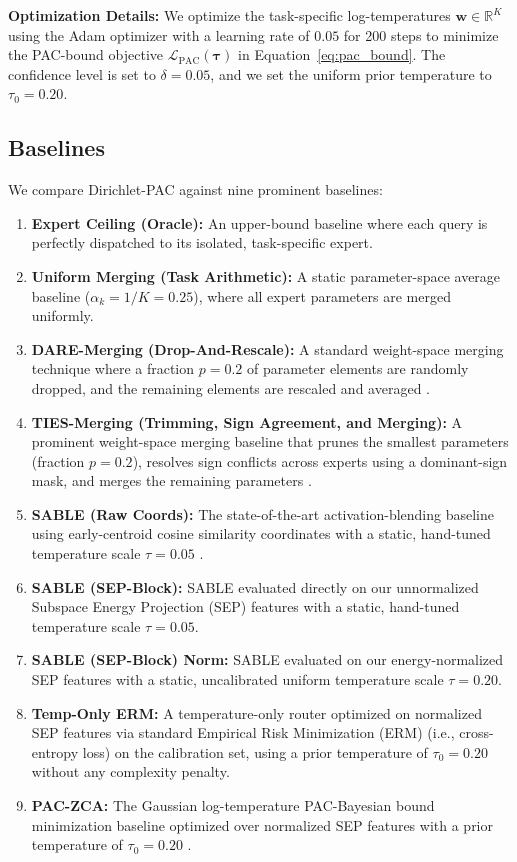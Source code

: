 \textbf{Optimization Details:} We optimize the task-specific log-temperatures $\mathbf{w} \in \mathbb{R}^K$ using the Adam optimizer with a learning rate of $0.05$ for 200 steps to minimize the PAC-bound objective $\mathcal{L}_{\text{PAC}}(\boldsymbol{\tau})$ in Equation~\eqref{eq:pac_bound}. The confidence level is set to $\delta = 0.05$, and we set the uniform prior temperature to $\tau_0 = 0.20$.

\subsection{Baselines}
We compare Dirichlet-PAC against nine prominent baselines:
\begin{enumerate}
    \item \textbf{Expert Ceiling (Oracle):} An upper-bound baseline where each query is perfectly dispatched to its isolated, task-specific expert.
    \item \textbf{Uniform Merging (Task Arithmetic):} A static parameter-space average baseline ($\alpha_k = 1/K = 0.25$), where all expert parameters are merged uniformly.
    \item \textbf{DARE-Merging (Drop-And-Rescale):} A standard weight-space merging technique where a fraction $p = 0.2$ of parameter elements are randomly dropped, and the remaining elements are rescaled and averaged \cite{dare2024}.
    \item \textbf{TIES-Merging (Trimming, Sign Agreement, and Merging):} A prominent weight-space merging baseline that prunes the smallest parameters (fraction $p = 0.2$), resolves sign conflicts across experts using a dominant-sign mask, and merges the remaining parameters \cite{ties2023}.
    \item \textbf{SABLE (Raw Coords):} The state-of-the-art activation-blending baseline using early-centroid cosine similarity coordinates with a static, hand-tuned temperature scale $\tau = 0.05$ \cite{sable2025}.
    \item \textbf{SABLE (SEP-Block):} SABLE evaluated directly on our unnormalized Subspace Energy Projection (SEP) features with a static, hand-tuned temperature scale $\tau = 0.05$.
    \item \textbf{SABLE (SEP-Block) Norm:} SABLE evaluated on our energy-normalized SEP features with a static, uncalibrated uniform temperature scale $\tau = 0.20$.
    \item \textbf{Temp-Only ERM:} A temperature-only router optimized on normalized SEP features via standard Empirical Risk Minimization (ERM) (i.e., cross-entropy loss) on the calibration set, using a prior temperature of $\tau_0 = 0.20$ without any complexity penalty.
    \item \textbf{PAC-ZCA:} The Gaussian log-temperature PAC-Bayesian bound minimization baseline optimized over normalized SEP features with a prior temperature of $\tau_0 = 0.20$ \cite{paczca2026}.
\end{enumerate}

